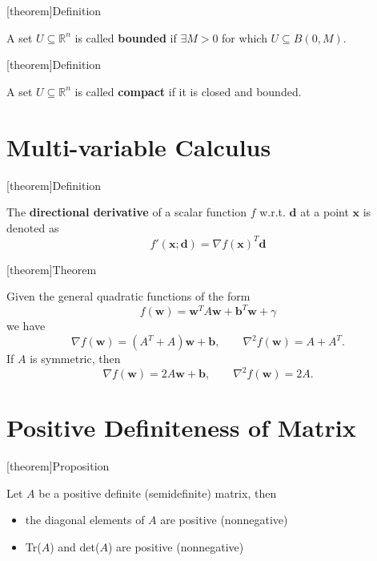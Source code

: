 \documentclass[12pt]{report}
\theoremstyle{definition}
\begin{document}
[theorem]{Definition}
\begin{boundedness}
    A set $U\subseteq\mathbb{R}^{n}$ is called \textbf{bounded}
    if $\exists M>0$ for which $U\subseteq B(0,M)$.
\end{boundedness}

[theorem]{Definition}
\begin{compactness}
    A set $U\subseteq\mathbb{R}^{n}$ is called \textbf{compact}
    if it is closed and bounded.
\end{compactness}

\section{Multi-variable Calculus}

[theorem]{Definition}
\begin{directional derivative}
    The \textbf{directional derivative} of a scalar function $f$ w.r.t.
    $\mathbf{d}$ at a point $\mathbf{x}$ is denoted as
    \[
        f'(\mathbf{x};\mathbf{d})=\nabla f(\mathbf{x})^T\mathbf{d}
    \]
\end{directional derivative}


[theorem]{Theorem}
\begin{gradient and hessian of quadratic functions}
    Given the general quadratic functions of the form
    \[
        f(\mathbf{w})=\mathbf{w}^TA\mathbf{w}+\mathbf{b}^T\mathbf{w}+\gamma
    \]
    we have
    \[
        \nabla f(\mathbf{w})=(A^T+A)\mathbf{w}+\mathbf{b},
        \qquad
        \nabla^2 f(\mathbf{w})=A+A^T.
    \]
    If $A$ is symmetric, then
    \[
        \nabla f(\mathbf{w})=2A\mathbf{w}+\mathbf{b},
        \qquad
        \nabla^2 f(\mathbf{w})=2A.
    \]
\end{gradient and hessian of quadratic functions}

\section{Positive Definiteness of Matrix}

[theorem]{Proposition}
\begin{diagonal elem positive}
    Let $A$ be a positive definite (semidefinite) matrix, then 
    \begin{itemize}
        \item the diagonal elements of $A$ are positive (nonnegative)
        \item Tr($A$) and det($A$) are positive (nonnegative)
    \end{itemize} 
\end{diagonal elem positive}
\end{document}

